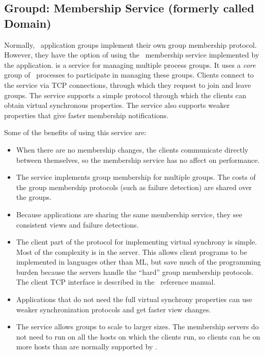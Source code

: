 \subsection{Groupd: Membership Service (formerly called Domain)}
\label{section:groupd}
Normally, \ensemble\ application groups implement their own group
membership protocol.  However, they have the option of using the
\ensemble\ membership service implemented by the 
application.   is a service for managing multiple
process groups.  It uses a \emph{core} group of \ensemble\ processes
to participate in managing these groups.  Clients connect to the
service via TCP connections, through which they request to join and
leave groups.  The service supports a simple protocol through which
the clients can obtain virtual synchronous properties.  The service
also supports weaker properties that give faster membership
notifications.


Some of the benefits of using this service are:
\begin{itemize}
\item
When there are no membership changes, the clients communicate directly
between themselves, so the membership service has no affect on
performance.
\item
The service implements group membership for multiple groups.  The
costs of the group membership protocols (such as failure detection)
are shared over the groups.
\item
Because applications are sharing the same membership service, they see
consistent views and failure detections.
\item
The client part of the protocol for implementing virtual synchrony is
simple.  Most of the complexity is in the server.  This allows client
programs to be implemented in languages other than ML, but save much
of the programming burden because the servers handle the ``hard''
group membership protocols.  The client TCP interface is described in
the \ensemble\ reference manual.
\item
Applications that do not need the full virtual synchrony properties
can use weaker synchronization protocols and get faster view changes.
\item
The service allows groups to scale to larger sizes.  The membership
servers do not need to run on all the hosts on which the clients run,
so clients can be on more hosts than are normally supported by
\ensemble.
\end{itemize}

